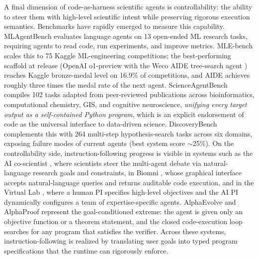 A final dimension of code-as-harness scientific agents is controllability: the ability to steer them with high-level scientific intent while preserving rigorous execution semantics. Benchmarks have rapidly emerged to measure this capability. MLAgentBench \citep{huang2024mlagentbenchevaluatinglanguageagents} evaluates language agents on 13 open-ended ML research tasks, requiring agents to read code, run experiments, and improve metrics. MLE-bench \citep{chan2025mlebenchevaluatingmachinelearning} scales this to 75 Kaggle ML-engineering competitions; the best-performing scaffold at release (OpenAI o1-preview with the Weco AIDE tree-search agent \citep{hu2025surveyscientificlargelanguage}) reaches Kaggle bronze-medal level on 16.9\% of competitions, and AIDE achieves roughly three times the medal rate of the next agent. ScienceAgentBench \citep{chen2025scienceagentbenchrigorousassessmentlanguage} compiles 102 tasks adapted from peer-reviewed publications across bioinformatics, computational chemistry, GIS, and cognitive neuroscience, \textit{unifying every target output as a self-contained Python program}, which is an explicit endorsement of code as the universal interface to data-driven science. DiscoveryBench \citep{majumder2024discoverybenchdatadrivendiscoverylarge} complements this with 264 multi-step hypothesis-search tasks across six domains, exposing failure modes of current agents (best system score $\sim$25\%). On the controllability side, instruction-following progress is visible in systems such as the AI co-scientist \citep{gottweis2025aicoscientist}, where scientists steer the multi-agent debate via natural-language research goals and constraints, in Biomni \citep{huang2025biomni}, whose graphical interface accepts natural-language queries and returns auditable code execution, and in the Virtual Lab \citep{swanson2025virtual}, where a human PI specifies high-level objectives and the AI PI dynamically configures a team of expertise-specific agents. AlphaEvolve \citep{novikov2025alphaevolvecodingagentscientific} and AlphaProof \citep{hubert2025olympiad} represent the goal-conditioned extreme: the agent is given only an objective function or a theorem statement, and the closed code-execution loop searches for any program that satisfies the verifier. Across these systems, instruction-following is realized by translating user goals into typed program specifications that the runtime can rigorously enforce.

